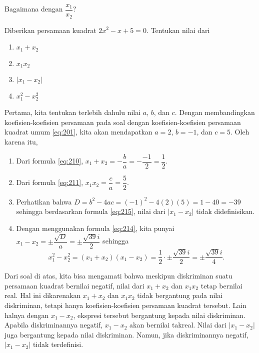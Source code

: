 	\begin{explbox}
		Bagaimana dengan $ \dfrac{x_{1}}{x_{2}} $?
	\end{explbox}
	
	\begin{contoh}
		Diberikan persamaan kuadrat $ 2x^{2} - x + 5 = 0 $. Tentukan nilai dari
		\begin{enumerate}
			\item $ x_{1} + x_{2} $
			\item $ x_{1}x_{2} $
			\item $ \left|x_{1} - x_{2}\right| $
			\item $ x_{1}^{2} - x_{2}^{2} $
		\end{enumerate}
	\end{contoh}
	\begin{jawab}
		Pertama, kita tentukan terlebih dahulu nilai $ a $, $ b $, dan $ c $. Dengan membandingkan koefisien-koefisien persamaan pada soal dengan koefisien-koefisien persamaan kuadrat umum \ref{eq:201}, kita akan mendapatkan $ a = 2 $, $ b = -1 $, dan $ c = 5 $. Oleh karena itu,
		\begin{enumerate}
			\item Dari formula \ref{eq:210}, $ x_{1} + x_{2} = -\dfrac{b}{a} = -\dfrac{-1}{2} = \dfrac{1}{2} $.
			\item Dari formula \ref{eq:211}, $ x_{1}x_{2} = \dfrac{c}{a} = \dfrac{5}{2} $.
			\item Perhatikan bahwa $ D = b^{2} - 4ac = \left(-1\right)^{2} - 4\left(2\right)\left(5\right) = 1 - 40 = -39 $ sehingga berdasarkan formula \ref{eq:215}, nilai dari $ \left|x_{1} - x_{2}\right| $ tidak didefinisikan.
			\item Dengan menggunakan formula \ref{eq:214}, kita punyai $ x_{1} - x_{2} = \pm \dfrac{\sqrt{D}}{a} = \pm \dfrac{\sqrt{39}i}{2} $ sehingga
			\[ x_{1}^{2} - x_{2}^{2} = \left(x_{1} + x_{2}\right)\left(x_{1} - x_{2}\right) = \frac{1}{2} \cdot \pm \frac{\sqrt{39}i}{2} = \pm \frac{\sqrt{39}i}{4}. \]
		\end{enumerate}
	\end{jawab}
	
	\par Dari soal di atas, kita bisa mengamati bahwa meskipun diskriminan suatu persamaan kuadrat bernilai negatif, nilai dari $ x_{1} + x_{2} $ dan $ x_{1}x_{2} $ tetap bernilai real. Hal ini dikarenakan $ x_{1} + x_{2} $ dan $ x_{1}x_{2} $ tidak bergantung pada nilai diskriminan, tetapi hanya koefisien-koefisien persamaan kuadrat tersebut. Lain halnya dengan $ x_{1} - x_{2} $, ekspresi tersebut bergantung kepada nilai diskriminan. Apabila diskriminannya negatif, $ x_{1} - x_{2} $ akan bernilai takreal. Nilai dari $ \left|x_{1} - x_{2}\right| $ juga bergantung kepada nilai diskriminan. Namun, jika diskriminannya negatif, $ \left|x_{1} - x_{2}\right| $ tidak terdefinisi.
	
